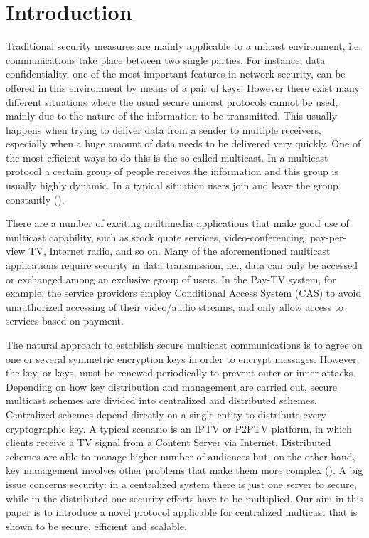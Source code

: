\documentclass[a4paper,11pt]{amsart}
\theoremstyle{definition}
\begin{document}
\section{Introduction}

Traditional security measures are mainly applicable to a unicast
environment, i.e. communications take place between two single
parties. For instance, data confidentiality, one of the most important
features in network security, can be offered in this environment by
means of a pair of keys. However there exist many different situations
where the usual secure unicast protocols cannot be used, mainly due to
the nature of the information to be transmitted. This usually happens
when trying to deliver data from a sender to multiple receivers,
especially when a huge amount of data needs to be delivered very
quickly. One of the most efficient ways to do this is the so-called
multicast. In a multicast protocol a certain group of people receives
the information and this group is usually highly dynamic. In a typical
situation users join and leave the group constantly (\cite{survey}).

There are a number of exciting multimedia applications that make good
use of multicast capability, such as stock quote services,
video-conferencing, pay-per-view TV, Internet radio, and so on.
Many of the aforementioned multicast applications require security in
data transmission, i.e., data can only be accessed or exchanged among
an exclusive group of users. In the Pay-TV system, for example, the
service providers employ Conditional Access System (CAS) to avoid
unauthorized accessing of their video/audio streams, and only allow
access to services based on payment.

The natural approach to establish secure multicast communications is
to agree on one or several symmetric encryption keys in order to
encrypt messages. However, the key, or keys, must be renewed
periodically to prevent outer or inner attacks.  Depending on how key
distribution and management are carried out, secure multicast schemes
are divided into centralized and distributed schemes.  Centralized
schemes depend directly on a single entity to distribute every
cryptographic key. A typical scenario is an IPTV or P2PTV platform, in
which clients receive a TV signal from a Content Server via Internet.
Distributed schemes are able to manage higher number of audiences but,
on the other hand, key management involves other problems that make
them more complex (\cite{survey}). A big issue concerns security: in a
centralized system there is just one server to secure, while in the
distributed one security efforts have to be multiplied. Our aim in
this paper is to introduce a novel protocol applicable for centralized
multicast that is shown to be secure, efficient and scalable.
\end{document}
